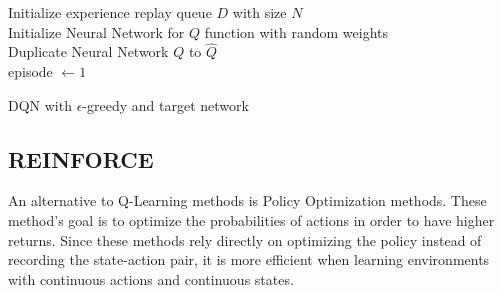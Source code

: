 \begin{algorithm}
	\SetAlgoLined
	\DontPrintSemicolon
	Initialize experience replay queue $D$ with size $N$ \\
	Initialize Neural Network for $Q$ function with random weights \\
	Duplicate Neural Network $Q$ to $\hat{Q}$ \\
	episode $\leftarrow 1$\\
	\caption{DQN with $\epsilon$-greedy and target network}\label{alg:dqn}
\end{algorithm}

\subsection{REINFORCE}

An alternative to Q-Learning methods is Policy Optimization methods. These method's goal is to optimize the probabilities of actions in order to have higher returns. Since these methods rely directly on optimizing the policy instead of recording the state-action pair, it is more efficient when learning environments with continuous actions and continuous states.

